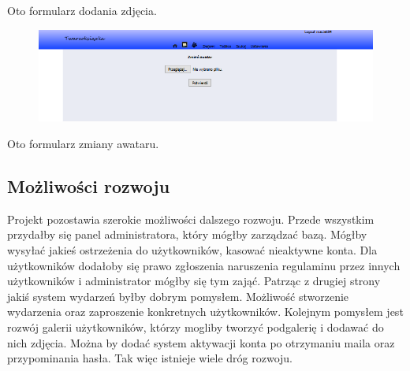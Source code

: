 \documentclass[a4paper,10pt,table]{article}
\begin{document}
Oto formularz dodania zdjęcia.
\begin{figure}[h]
\begin{center}
\includegraphics[scale=0.65]{scrn/14}
\end{center}
\end{figure}\newline
Oto formularz zmiany awataru.
\subsection{Możliwości rozwoju}
Projekt pozostawia szerokie możliwości dalszego rozwoju. Przede wszystkim przydałby się panel administratora, który mógłby zarządzać bazą. Mógłby wysyłać jakieś ostrzeżenia do użytkowników, kasować nieaktywne konta. Dla użytkowników dodałoby się prawo zgłoszenia naruszenia regulaminu przez innych użytkowników i administrator mógłby się tym zająć.
Patrząc z drugiej strony jakiś system wydarzeń byłby dobrym pomysłem. Możliwość stworzenie wydarzenia oraz zaproszenie konkretnych użytkowników.
Kolejnym pomysłem jest rozwój galerii użytkowników, którzy mogliby tworzyć podgalerię i dodawać do nich zdjęcia.
Można by dodać system aktywacji konta po otrzymaniu maila oraz przypominania hasła.
Tak więc istnieje wiele dróg rozwoju.
\end{document}
